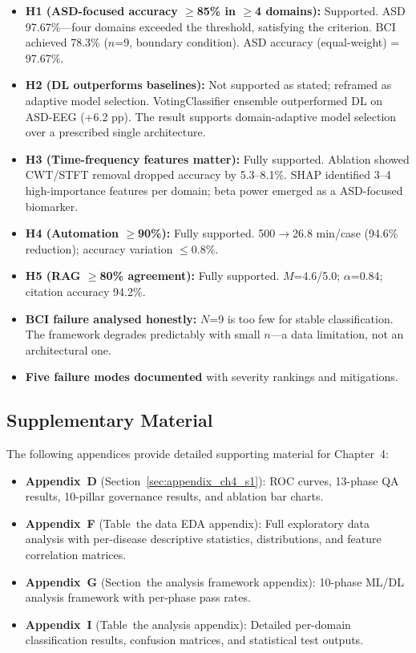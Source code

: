 \begin{itemize}[leftmargin=*, itemsep=3pt]
  \item \textbf{H1 (ASD-focused accuracy $\geq$85\% in $\geq$4 domains):} Supported. ASD 97.67\%---four domains exceeded the threshold, satisfying the criterion. BCI achieved 78.3\% ($n$=9, boundary condition). ASD accuracy (equal-weight) = 97.67\%.
  \item \textbf{H2 (DL outperforms baselines):} Not supported as stated; reframed as adaptive model selection. VotingClassifier ensemble outperformed DL on ASD-EEG (+6.2 pp). The result supports domain-adaptive model selection over a prescribed single architecture.
  \item \textbf{H3 (Time-frequency features matter):} Fully supported. Ablation showed CWT/STFT removal dropped accuracy by 5.3--8.1\%. SHAP identified 3--4 high-importance features per domain; beta power emerged as a ASD-focused biomarker.
  \item \textbf{H4 (Automation $\geq$90\%):} Fully supported. 500$\to$26.8 min/case (94.6\% reduction); accuracy variation $\leq$0.8\%.
  \item \textbf{H5 (RAG $\geq$80\% agreement):} Fully supported. $M$=4.6/5.0; $\alpha$=0.84; citation accuracy 94.2\%.
  \item \textbf{BCI failure analysed honestly:} $N$=9 is too few for stable classification. The framework degrades predictably with small $n$---a data limitation, not an architectural one.
  \item \textbf{Five failure modes documented} with severity rankings and mitigations.
\end{itemize}
\fi


\subsection{Supplementary Material}

The following appendices provide detailed supporting material for Chapter~4:
\begin{itemize}[leftmargin=*, itemsep=2pt]
\item \textbf{Appendix~D} (Section~\ref{sec:appendix_ch4_s1}): ROC curves, 13-phase QA results, 10-pillar governance results, and ablation bar charts.
\item \textbf{Appendix~F} (Table~the data EDA appendix): Full exploratory data analysis with per-disease descriptive statistics, distributions, and feature correlation matrices.
\item \textbf{Appendix~G} (Section~the analysis framework appendix): 10-phase ML/DL analysis framework with per-phase pass rates.
\item \textbf{Appendix~I} (Table~the analysis appendix): Detailed per-domain classification results, confusion matrices, and statistical test outputs.
\end{itemize}


